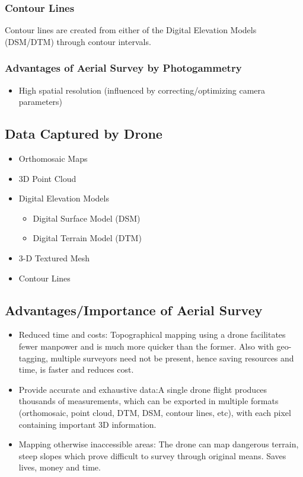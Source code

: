 \documentclass[11pt,twocolumn,letterpaper]{article}
\begin{document}
\subsubsection{Contour Lines}
Contour lines are created from either of the Digital Elevation Models (DSM/DTM) through contour intervals.

\subsubsection{Advantages of Aerial Survey by Photogammetry }

\begin{itemize}
\item High spatial resolution (influenced by correcting/optimizing camera parameters)

\end{itemize}

\subsection{Data Captured by Drone}
\begin{itemize}
\item Orthomosaic Maps
\item 3D Point Cloud
\item Digital Elevation Models
\begin{itemize}
    \item Digital Surface Model (DSM)
    \item Digital Terrain Model (DTM)
\end{itemize}
\item 3-D Textured Mesh
\item Contour Lines

\end{itemize}

\subsection{Advantages/Importance of Aerial Survey}
\begin{itemize}
\item Reduced time and costs: Topographical mapping using a drone facilitates fewer manpower and is much more quicker than the former. Also with geo-tagging, multiple surveyors need not be present, hence saving resources and time, is faster and reduces cost.
\item Provide accurate and exhaustive data:A single drone flight produces thousands of measurements, which can be exported in multiple formats (orthomosaic, point cloud, DTM, DSM, contour lines, etc), with each pixel containing important 3D information.
\item Mapping otherwise inaccessible areas:
The drone can map dangerous terrain, steep slopes which prove difficult to survey through original means.
Saves lives, money and time.
\end{itemize}
\end{document}
